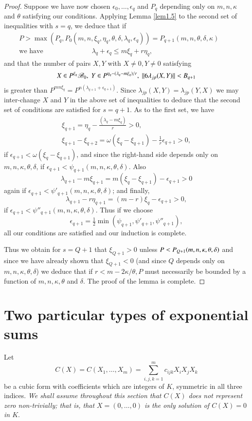 \begin{proof}
Suppose we have now chosen $\epsilon_0,\ldots,\epsilon_q$ and $P_q$ 
depending only on $m,n,\kappa$ and $\theta$ satisfying our conditions. 
Applying Lemma \ref{lem1.5} to the second set of inequalities with 
$s=q$, we deduce that if 
\begin{gather*}
P>\max(P_q,P_0(m,n,\xi_q,\eta_q,\theta,\delta,\lambda_q, 
\epsilon_q))=P_{q+1}(m,n,\theta,\delta,\kappa)\\
\text{we have}\hspace{3cm} \lambda_q+\epsilon_q\leq m\xi_q+r\eta_q,\hspace{5cm}  
\end{gather*}
and that the number of pairs $X,Y$ with $X\neq 0, Y\neq 0$ satisfying
$$
X\in P^{\xi_q}\mathscr{B}_0,\; Y\in P^{\eta_q-(\lambda_q-m\xi_q)/r},\; 
||6\lambda_{jp}(X,Y)||<B_{q+1}
$$
is greater than $P^{mn\xi_q}=P^{n(\lambda_{q+1}+\epsilon_{q+1})}$. 
Since $\lambda_{jp}(X,Y)=\lambda_{jp}(Y,X)$ we may inter-change $X$ 
and $Y$ in the above set of inequalities to deduce that the second set 
of conditions are satisfied for $s=q+1$. As to the first set, we have 
\begin{gather*}
\xi_{q+1}=\eta_q-\frac{(\lambda_q-m\xi_q)}{r}>0,\\ 
\xi_{q+1}-\xi_{q+2} 
=\omega(\xi_q-\xi_{q+1})-\frac{1}{r}\epsilon_{q+1}>0,
\end{gather*}
if $\epsilon_{q+1}<\omega(\xi_q-\xi_{q+1})$, and since the right-hand 
side depends only on $m,n,\kappa,\theta,\delta$, if $\epsilon_{q+1} 
<\psi_{q+1}(m,n,\kappa,\theta,\delta)$. Also
$$
\lambda_{q+1}-m\xi_{q+1}=m(\xi_q-\xi_{q+1})-\epsilon_{q+1}>0
$$
again if $\epsilon_{q+1}<\psi'_{q+1}(m,n,\kappa,\theta,\delta)$; and 
finally,
$$
\lambda_{q+1}-r\eta_{q+1}=(m-r)\xi_q-\epsilon_{q+1}>0,
$$
if $\epsilon_{q+1}<\psi''_{q+1}(m,n,\kappa,\theta,\delta)$. Thus if we 
choose 
$$
\epsilon_{q+1}=\tfrac{1}{2}\min (\psi_{q+1},\psi'_{q+1}, 
\psi''_{q+1}),
$$ 
all our conditions are satisfied and our induction 
is complete.

Thus we obtain for $s=Q+1$ that $\xi_{Q+1}>0$ unless $P<P_{Q+1} 
\break (m,n,\kappa,\theta,\delta)$ and since we have already shown that $\xi_{Q+1} 
<0$ (and since $Q$ depends only on $m,n,\kappa,\theta,\delta$) we deduce 
that if $r<m-2\kappa/\theta,P$ must necessarily be bounded by a function of 
$m,n,\kappa,\theta$ and $\delta$. The proof of the lemma is complete.
\end{proof}

\section{Two particular types of exponential sums}\label{sec2}
Let 
$$
C(X)=C(X_1,\ldots,X_m)=\sum\limits_{i,j,k=1}^m c_{ijk}X_iX_jX_k
$$
be a cubic form with coefficients which are integers of $K$, symmetric 
in all three indices. \textit{We shall assume throughout this section that 
$C(X)$ does not represent zero non-trivially; that is, that 
$X=(0,\ldots,0)$ is the only solution of $C(X)=0$ in $K$}.

